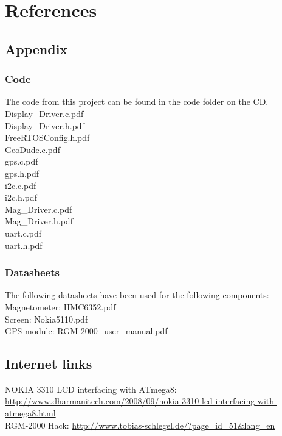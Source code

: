 \chapter{References}


\section{Appendix}

\subsection{Code}
The code from this project can be found in the code folder on the CD.\\
Display\_Driver.c.pdf\\
Display\_Driver.h.pdf\\
FreeRTOSConfig.h.pdf\\
GeoDude.c.pdf\\
gps.c.pdf\\
gps.h.pdf\\
i2c.c.pdf\\
i2c.h.pdf\\
Mag\_Driver.c.pdf\\
Mag\_Driver.h.pdf\\
uart.c.pdf\\
uart.h.pdf\\


\subsection{Datasheets}
The following datasheets have been used for the following components:\\
Magnetometer: HMC6352.pdf\\
Screen: Nokia5110.pdf\\
GPS module: RGM-2000\_user\_manual.pdf\\

\section{Internet links}
NOKIA 3310 LCD interfacing with ATmega8: \url{http://www.dharmanitech.com/2008/09/nokia-3310-lcd-interfacing-with-atmega8.html}\label{[1]}\\
RGM-2000 Hack: \url{http://www.tobias-schlegel.de/?page_id=51&lang=en}\\